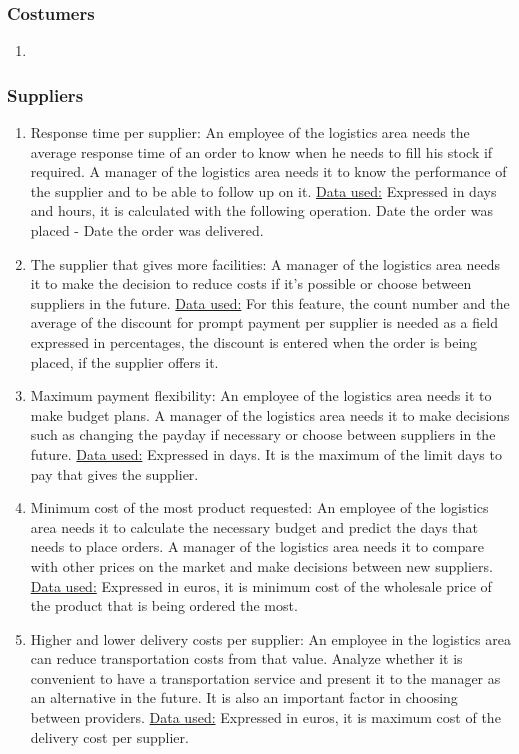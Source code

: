 \documentclass{article}
\begin{document}
\subsubsection{Costumers}
\begin{enumerate}
  \item
\end{enumerate}

\subsubsection{Suppliers}
\begin{enumerate}
  \item Response time per supplier: An employee of the logistics area needs the average response time of an order to know when he needs to fill his stock if required. A manager of the logistics area needs it to know the performance of the supplier and to be able to follow up on it. \underline{Data used:} Expressed in days and hours, it is calculated with the following operation. Date the order was placed - Date the order was delivered.
  \item The supplier that gives more facilities: A manager of the logistics area needs it to make the decision to reduce costs if it’s possible or choose between suppliers in the future. \underline{Data used:} For this feature, the count number and the average of the discount for prompt payment per supplier is needed as a field expressed in percentages, the discount is entered when the order is being placed, if the supplier offers it.
  \item Maximum payment flexibility: An employee of the logistics area needs it to make budget plans. A manager of the logistics area needs it to make decisions such as changing the payday if necessary or choose between suppliers in the future. \underline{Data used:} Expressed in days. It is the maximum of the limit days to pay that gives the supplier.
  \item Minimum cost of the most product requested: An employee of the logistics area needs it to calculate the necessary budget and predict the days that needs to place orders. A manager of the logistics area needs it to compare with other prices on the market and make decisions between new suppliers. \underline{Data used:} Expressed in euros, it is minimum cost of the wholesale price of the product that is being ordered the most.
  \item Higher and lower delivery costs per supplier: An employee in the logistics area can reduce transportation costs from that value. Analyze whether it is convenient to have a transportation service and present it to the manager as an alternative in the future. It is also an important factor in choosing between providers. \underline{Data used:} Expressed in euros, it is maximum cost of the delivery cost per supplier.
\end{enumerate}
\end{document}
